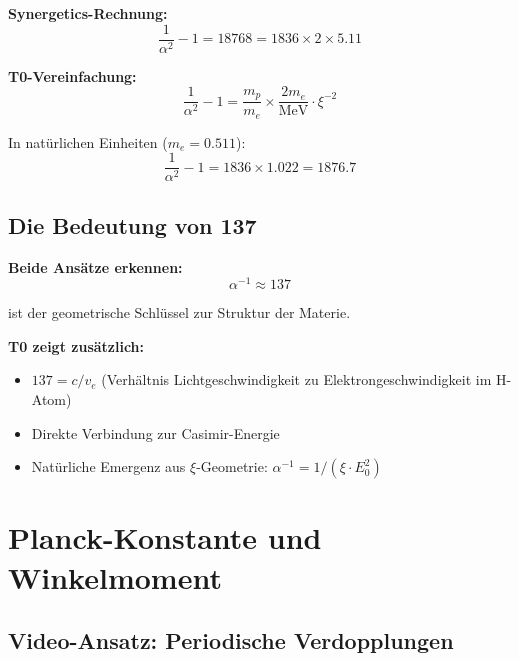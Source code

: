 \documentclass[12pt,a4paper]{article}
\newcommand{\xipar}{\xi}
\begin{document}
	\begin{vergleich}
		\textbf{Synergetics-Rechnung:}
		\begin{equation}
			\frac{1}{\alpha^2} - 1 = 18768 = 1836 \times 2 \times 5.11
		\end{equation}
		
		\textbf{T0-Vereinfachung:}
		\begin{equation}
			\boxed{\frac{1}{\alpha^2} - 1 = \frac{m_p}{m_e} \times \frac{2m_e}{\text{MeV}} \cdot \xipar^{-2}}
		\end{equation}
		
		In natürlichen Einheiten ($m_e = 0.511$):
		\begin{equation}
			\boxed{\frac{1}{\alpha^2} - 1 = 1836 \times 1.022 = 1876.7}
		\end{equation}
	\end{vergleich}
	
	\subsection{Die Bedeutung von 137}
	
	\begin{gemeinsam}
		\textbf{Beide Ansätze erkennen:}
		\begin{equation}
			\alpha^{-1} \approx 137
		\end{equation}
		
		ist der geometrische Schlüssel zur Struktur der Materie.
		
		\textbf{T0 zeigt zusätzlich:}
		\begin{itemize}
			\item $137 = c/v_e$ (Verhältnis Lichtgeschwindigkeit zu Elektrongeschwindigkeit im H-Atom)
			\item Direkte Verbindung zur Casimir-Energie
			\item Natürliche Emergenz aus $\xipar$-Geometrie: $\alpha^{-1} = 1/(\xipar \cdot E_0^2)$
		\end{itemize}
	\end{gemeinsam}
	
	\section{Planck-Konstante und Winkelmoment}
	
	\subsection{Video-Ansatz: Periodische Verdopplungen}
	
\end{document}
